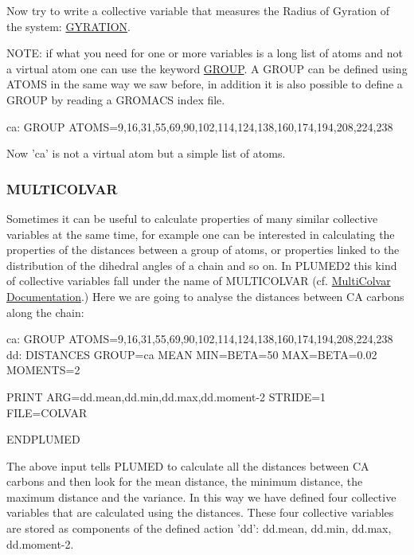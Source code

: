 Now try to write a collective variable that measures the Radius of Gyration of the system\+: \hyperlink{GYRATION}{G\+Y\+R\+A\+T\+I\+O\+N}.

N\+O\+T\+E\+: if what you need for one or more variables is a long list of atoms and not a virtual atom one can use the keyword \hyperlink{GROUP}{G\+R\+O\+U\+P}. A G\+R\+O\+U\+P can be defined using A\+T\+O\+M\+S in the same way we saw before, in addition it is also possible to define a G\+R\+O\+U\+P by reading a G\+R\+O\+M\+A\+C\+S index file.

\begin{DoxyVerb}ca: GROUP ATOMS=9,16,31,55,69,90,102,114,124,138,160,174,194,208,224,238
\end{DoxyVerb}


Now 'ca' is not a virtual atom but a simple list of atoms.\hypertarget{belfast-1_multicol}{}\subsubsection{M\+U\+L\+T\+I\+C\+O\+L\+V\+A\+R}\label{belfast-1_multicol}
Sometimes it can be useful to calculate properties of many similar collective variables at the same time, for example one can be interested in calculating the properties of the distances between a group of atoms, or properties linked to the distribution of the dihedral angles of a chain and so on. In P\+L\+U\+M\+E\+D2 this kind of collective variables fall under the name of M\+U\+L\+T\+I\+C\+O\+L\+V\+A\+R (cf. \hyperlink{mcolv}{Multi\+Colvar Documentation}.) Here we are going to analyse the distances between C\+A carbons along the chain\+:

\begin{DoxyVerb}ca: GROUP ATOMS=9,16,31,55,69,90,102,114,124,138,160,174,194,208,224,238
dd: DISTANCES GROUP=ca MEAN MIN={BETA=50} MAX={BETA=0.02} MOMENTS=2

PRINT ARG=dd.mean,dd.min,dd.max,dd.moment-2 STRIDE=1 FILE=COLVAR 

ENDPLUMED
\end{DoxyVerb}


The above input tells P\+L\+U\+M\+E\+D to calculate all the distances between C\+A carbons and then look for the mean distance, the minimum distance, the maximum distance and the variance. In this way we have defined four collective variables that are calculated using the distances. These four collective variables are stored as components of the defined action 'dd'\+: dd.\+mean, dd.\+min, dd.\+max, dd.\+moment-\/2.


